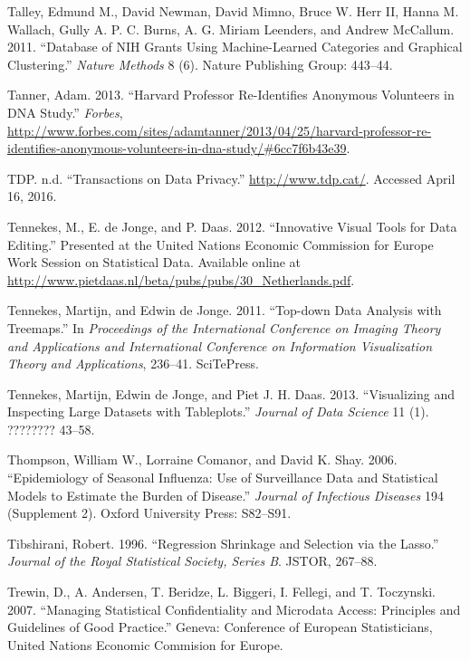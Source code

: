 \documentclass[]{krantz}
\begin{document}
\hypertarget{ref-talley2011database}{}
Talley, Edmund M., David Newman, David Mimno, Bruce W. Herr II, Hanna M.
Wallach, Gully A. P. C. Burns, A. G. Miriam Leenders, and Andrew
McCallum. 2011. ``Database of NIH Grants Using Machine-Learned
Categories and Graphical Clustering.'' \emph{Nature Methods} 8 (6).
Nature Publishing Group: 443--44.

\hypertarget{ref-forbesharvard}{}
Tanner, Adam. 2013. ``Harvard Professor Re-Identifies Anonymous
Volunteers in DNA Study.'' \emph{Forbes},
\url{http://www.forbes.com/sites/adamtanner/2013/04/25/harvard-professor-re-identifies-anonymous-volunteers-in-dna-study/\#6cc7f6b43e39}.

\hypertarget{ref-TransactionsonDataPrivacy}{}
TDP. n.d. ``Transactions on Data Privacy.'' \url{http://www.tdp.cat/}.
Accessed April 16, 2016.

\hypertarget{ref-Tennekes2012}{}
Tennekes, M., E. de Jonge, and P. Daas. 2012. ``Innovative Visual Tools
for Data Editing.'' Presented at the United Nations Economic Commission
for Europe Work Session on Statistical Data. Available online at
\url{http://www.pietdaas.nl/beta/pubs/pubs/30_Netherlands.pdf}.

\hypertarget{ref-tennekes2011top}{}
Tennekes, Martijn, and Edwin de Jonge. 2011. ``Top-down Data Analysis
with Treemaps.'' In \emph{Proceedings of the International Conference on
Imaging Theory and Applications and International Conference on
Information Visualization Theory and Applications}, 236--41. SciTePress.

\hypertarget{ref-tennekes2013visualizing}{}
Tennekes, Martijn, Edwin de Jonge, and Piet J. H. Daas. 2013.
``Visualizing and Inspecting Large Datasets with Tableplots.''
\emph{Journal of Data Science} 11 (1). ???????? 43--58.

\hypertarget{ref-thompson2006epidemiology}{}
Thompson, William W., Lorraine Comanor, and David K. Shay. 2006.
``Epidemiology of Seasonal Influenza: Use of Surveillance Data and
Statistical Models to Estimate the Burden of Disease.'' \emph{Journal of
Infectious Diseases} 194 (Supplement 2). Oxford University Press:
S82--S91.

\hypertarget{ref-tibshirani1996regression}{}
Tibshirani, Robert. 1996. ``Regression Shrinkage and Selection via the
Lasso.'' \emph{Journal of the Royal Statistical Society, Series B}.
JSTOR, 267--88.

\hypertarget{ref-trewin2007managing}{}
Trewin, D., A. Andersen, T. Beridze, L. Biggeri, I. Fellegi, and T.
Toczynski. 2007. ``Managing Statistical Confidentiality and Microdata
Access: Principles and Guidelines of Good Practice.'' Geneva: Conference
of European Statisticians, United Nations Economic Commision for Europe.
\end{document}
